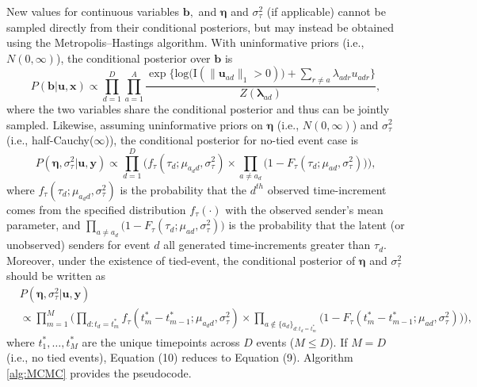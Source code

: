 \documentclass[12pt]{article}
\begin{document}
New values for continuous variables $\boldsymbol{b},$ and $\boldsymbol{\eta}$ and $\sigma^2_\tau$ (if applicable) cannot be sampled directly from their conditional posteriors, but may instead be obtained using the Metropolis--Hastings algorithm. With uninformative priors (i.e., $N({0},\infty)$), the conditional posterior over $\boldsymbol{b}$ is
\begin{equation}
P(\boldsymbol{b}| \boldsymbol{u}, \boldsymbol{x})\propto \prod_{d=1}^D
\prod_{a=1}^A \frac{\exp\Big\{\mbox{log}\big(\text{I}( \lVert \boldsymbol{u}_{ad}\rVert_1 > 0)\big) + \sum\limits_{r \neq a} \lambda_{adr}u_{adr}\Big\}}{Z(\boldsymbol{\lambda}_{ad})},
\end{equation}
where the two variables share the conditional posterior and thus can be jointly sampled. Likewise, assuming uninformative priors on $\boldsymbol{\eta}$ (i.e., $N({0},\infty)$) and $\sigma_{\tau}^2$ (i.e., half-Cauchy($\infty$)), the conditional posterior for no-tied event case is
\begin{equation}
P(\boldsymbol{\eta}, \sigma_\tau^2| \boldsymbol{u}, \boldsymbol{y})\propto \prod_{d=1}^D\Big(f_{\tau}(\tau_{d}; \mu_{a_d d}, \sigma_\tau^2)\times \prod_{a\neq a_d}\big(1-F_{\tau}(\tau_{d}; \mu_{a d}, \sigma_\tau^2) \big)\Big),
\end{equation}
where $f_{\tau}(\tau_{d}; \mu_{a_d d}, \sigma_\tau^2)$ is the probability that the $d^{th}$ observed time-increment comes from the specified distribution $f_\tau(\cdot)$ with the observed sender's mean parameter, and $\prod_{a\neq a_d}\big(1-F_{\tau}(\tau_{d}; \mu_{a d}, \sigma_\tau^2) \big)$ is the probability that the latent (or unobserved) senders for event $d$ all generated time-increments greater than $\tau_d$. Moreover, under the existence of tied-event, the conditional posterior of $\boldsymbol{\eta}$ and $\sigma_{\tau}^2$ should be written as
\begin{equation}
\begin{aligned}
&P(\boldsymbol{\eta}, \sigma_\tau^2| \boldsymbol{u}, \boldsymbol{y})\\&\propto \prod_{m=1}^M\Big(\prod_{d:t_d=t_m^*}f_{\tau}(t_m^*-t_{m-1}^*; \mu_{a_d d}, \sigma_\tau^2)\times \prod_{a \notin \{a_d\}_{d:t_d=t_m^*}}\big(1-F_{\tau}(t_m^*-t_{m-1}^*; \mu_{a d}, \sigma_\tau^2) \big)\Big),
\end{aligned}
\end{equation}
where $t_1^*,\ldots,t_M^*$ are the unique timepoints across $D$ events ($M \leq D$). If $M=D$ (i.e., no tied events), Equation (10) reduces to Equation (9). Algorithm \ref{alg:MCMC} provides the pseudocode.
\end{document}
